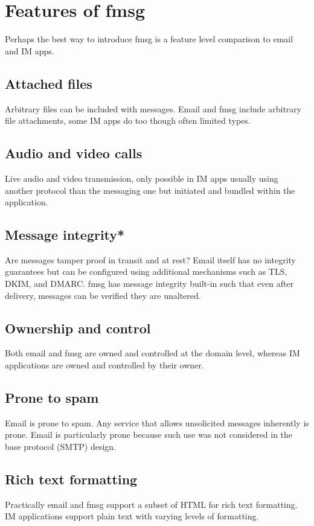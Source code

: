 \documentclass[11pt, a4paper]{article}
\begin{document}
\section{Features of fmsg}
Perhaps the best way to introduce fmsg is a feature level comparison to email and IM apps.

\subsection{Attached files}
Arbitrary files can be included with messages. Email and fmsg include arbitrary file attachments, some IM apps do too though often limited types.

\subsection{Audio and video calls}
Live audio and video transmission, only possible in IM apps usually using another protocol than the messaging one but initiated and bundled within the application.

\subsection{Message integrity*}
Are messages tamper proof in transit and at rest? Email itself has no integrity guarantees but can be configured using additional mechanisms such as TLS, DKIM, and DMARC. fmsg has message integrity built-in such that even after delivery, messages can be verified they are unaltered.

\subsection{Ownership and control}
Both email and fmsg are owned and controlled at the domain level, whereas IM applications are owned and controlled by their owner.

\subsection{Prone to spam}
Email is prone to spam. Any service that allows unsolicited messages inherently is prone. Email is particularly prone because such use was not considered in the base protocol (SMTP) design.

\subsection{Rich text formatting}
Practically email and fmsg support a subset of HTML for rich text formatting. IM applications support plain text with varying levels of formatting.
\end{document}
